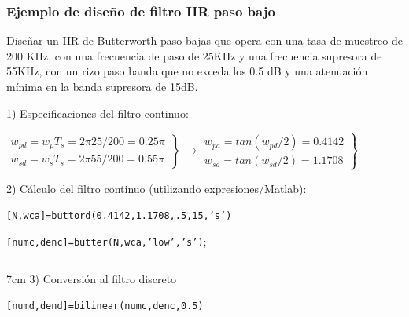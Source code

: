 


\begin{frame}
\frametitle{Ejemplo de diseño de filtro  IIR paso bajo}

\footnotesize
\color{olivegreen} Diseñar un IIR de Butterworth paso bajas que opera con una tasa de muestreo de 200 KHz, con una frecuencia de paso de 25KHz y una frecuencia supresora de 55KHz, con un rizo paso banda que no exceda los 0.5 dB y una atenuación mínima en la banda supresora de 15dB.
\color{gray}
\vspace{0.1cm}

1)  Especificaciones del filtro continuo:

\vspace{0.1cm}

$\left . \begin{array}{l}w_{pd}=w_pT_s=2\pi 25/200=0.25\pi\\w_{sd}=w_sT_s=2\pi 55/200=0.55\pi\end{array}\right \}$ $\rightarrow \left . \begin{array}{l}w_{pa}=tan(w_{pd}/2)=0.4142\\w_{sa}=tan(w_{sd}/2)=1.1708\end{array}\right \}$

\vspace{0.1cm}

2) Cálculo del filtro continuo (utilizando expresiones/Matlab):

\vspace{0.1cm}

\hspace{0.3cm}\texttt{[N,wca]=buttord(0.4142,1.1708,.5,15,'s')}

\vspace{0.1cm}

\hspace{0.3cm}\texttt{[numc,denc]=butter(N,wca,'low','s')};

\vspace{0.1cm}

\begin{columns}[T]
\begin{column}{7cm}
3) Conversión al filtro discreto

\vspace{0.1cm}

\hspace{0.3cm}\texttt{[numd,dend]=bilinear(numc,denc,0.5)}

\vspace{0.1cm}


\end{column}
\end{columns}
\end{frame}
